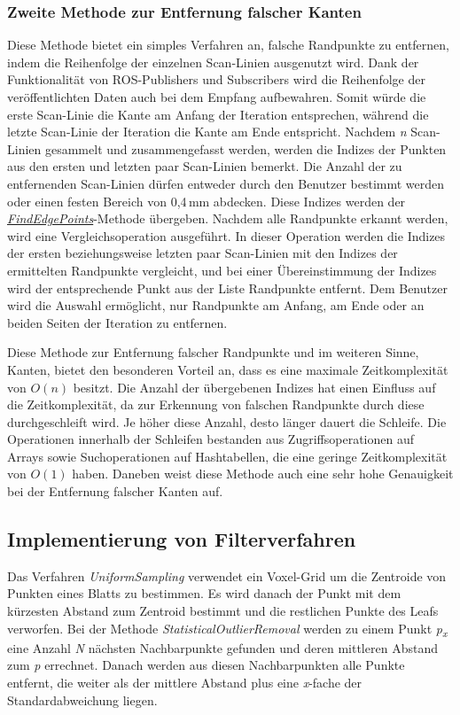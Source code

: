 \subsubsection{Zweite Methode zur Entfernung falscher Kanten}
Diese Methode bietet ein simples Verfahren an, falsche Randpunkte zu entfernen, indem die Reihenfolge der einzelnen Scan-Linien ausgenutzt wird. Dank der Funktionalität von ROS-Publishers und Subscribers wird die Reihenfolge der veröffentlichten Daten auch bei dem Empfang aufbewahren. Somit würde die erste Scan-Linie die Kante am Anfang der Iteration entsprechen, während die letzte Scan-Linie der Iteration die Kante am Ende entspricht. Nachdem \textit{n} Scan-Linien gesammelt und zusammengefasst werden, werden die Indizes der Punkten aus den ersten und letzten paar Scan-Linien bemerkt. Die Anzahl der zu entfernenden Scan-Linien dürfen entweder durch den Benutzer bestimmt werden oder einen festen Bereich von 0,4\,mm abdecken. Diese Indizes werden der \textit{\hyperref[alg:find_edge_points]{FindEdgePoints}}-Methode übergeben. Nachdem alle Randpunkte erkannt werden, wird eine Vergleichsoperation ausgeführt. In dieser Operation werden die Indizes der ersten beziehungsweise letzten paar Scan-Linien mit den Indizes der ermittelten Randpunkte vergleicht, und bei einer Übereinstimmung der Indizes wird der entsprechende Punkt aus der Liste Randpunkte entfernt. Dem Benutzer wird die Auswahl ermöglicht, nur Randpunkte am Anfang, am Ende oder an beiden Seiten der Iteration zu entfernen.

Diese Methode zur Entfernung falscher Randpunkte und im weiteren Sinne, Kanten, bietet den besonderen Vorteil an, dass es eine maximale Zeitkomplexität von $O(n)$ besitzt. Die Anzahl der übergebenen Indizes hat einen Einfluss auf die Zeitkomplexität, da zur Erkennung von falschen Randpunkte durch diese durchgeschleift wird. Je höher diese Anzahl, desto länger dauert die Schleife. Die Operationen innerhalb der Schleifen bestanden aus Zugriffsoperationen auf Arrays sowie Suchoperationen auf Hashtabellen, die eine geringe Zeitkomplexität von $O(1)$ haben. Daneben weist diese Methode auch eine sehr hohe Genauigkeit bei der Entfernung falscher Kanten auf.

\subsection{Implementierung von Filterverfahren}
Das Verfahren \textit{UniformSampling} verwendet ein Voxel-Grid um die Zentroide von Punkten eines Blatts zu bestimmen. Es wird danach der Punkt mit dem kürzesten Abstand zum Zentroid bestimmt und die restlichen Punkte des Leafs verworfen. Bei der Methode \textit{StatisticalOutlierRemoval} werden zu einem Punkt \textit{p\textsubscript{x}} eine Anzahl \textit{N} nächsten Nachbarpunkte gefunden und deren mittleren Abstand zum \textit{p} errechnet. Danach werden aus diesen Nachbarpunkten alle Punkte entfernt, die weiter als der mittlere Abstand plus eine \textit{x}-fache der Standardabweichung liegen. \autocite{rusu_3d_2011}

